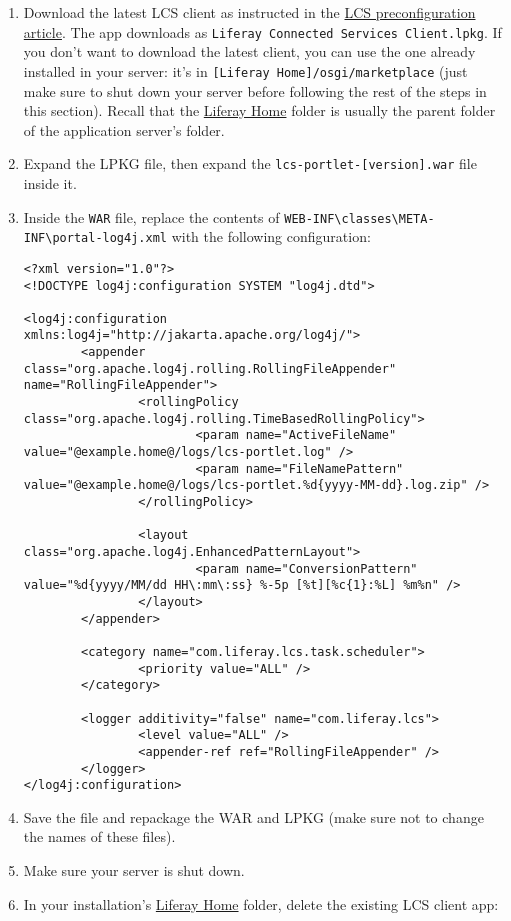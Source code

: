 \begin{enumerate}
\def\labelenumi{\arabic{enumi}.}
\item
  Download the latest LCS client as instructed in the
  \href{/docs/7-0/deploy/-/knowledge_base/d/lcs-preconfiguration\#downloading-the-lcs-client-app}{LCS
  preconfiguration article}. The app downloads as
  \texttt{Liferay\ Connected\ Services\ Client.lpkg}. If you don't want
  to download the latest client, you can use the one already installed
  in your server: it's in \texttt{{[}Liferay\ Home{]}/osgi/marketplace}
  (just make sure to shut down your server before following the rest of
  the steps in this section). Recall that the
  \href{/docs/7-0/deploy/-/knowledge_base/d/installing-product\#liferay-home}{Liferay
  Home} folder is usually the parent folder of the application server's
  folder.
\item
  Expand the LPKG file, then expand the
  \texttt{lcs-portlet-{[}version{]}.war} file inside it.
\item
  Inside the \texttt{WAR} file, replace the contents of
  \texttt{WEB-INF\textbackslash{}classes\textbackslash{}META-INF\textbackslash{}portal-log4j.xml}
  with the following configuration:

\begin{verbatim}
<?xml version="1.0"?>
<!DOCTYPE log4j:configuration SYSTEM "log4j.dtd">

<log4j:configuration xmlns:log4j="http://jakarta.apache.org/log4j/">
        <appender class="org.apache.log4j.rolling.RollingFileAppender" name="RollingFileAppender">
                <rollingPolicy class="org.apache.log4j.rolling.TimeBasedRollingPolicy">
                        <param name="ActiveFileName" value="@example.home@/logs/lcs-portlet.log" />
                        <param name="FileNamePattern" value="@example.home@/logs/lcs-portlet.%d{yyyy-MM-dd}.log.zip" />
                </rollingPolicy>

                <layout class="org.apache.log4j.EnhancedPatternLayout">
                        <param name="ConversionPattern" value="%d{yyyy/MM/dd HH\:mm\:ss} %-5p [%t][%c{1}:%L] %m%n" />
                </layout>
        </appender>

        <category name="com.liferay.lcs.task.scheduler">
                <priority value="ALL" />
        </category>

        <logger additivity="false" name="com.liferay.lcs">
                <level value="ALL" />
                <appender-ref ref="RollingFileAppender" />
        </logger>
</log4j:configuration>
\end{verbatim}
\item
  Save the file and repackage the WAR and LPKG (make sure not to change
  the names of these files).
\item
  Make sure your server is shut down.
\item
  In your installation's
  \href{/docs/7-0/deploy/-/knowledge_base/d/installing-product\#liferay-home}{Liferay
  Home} folder, delete the existing LCS client app:


\end{enumerate}
